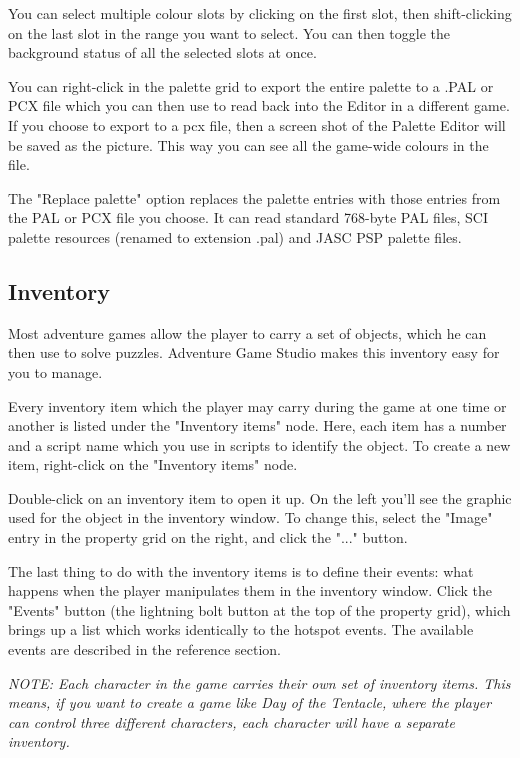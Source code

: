 You can select multiple colour slots by clicking on the first slot, then
shift-clicking on the last slot in the range you want to select. You can then
toggle the background status of all the selected slots at once.

You can right-click in the palette grid to export the entire palette to
a .PAL or PCX file which you can then use to read back into the Editor in
a different game.
If you choose to export to a pcx file, then a screen shot of the Palette Editor will
be saved as the picture. This way you can see all the game-wide colours in
the file.

The "Replace palette" option replaces the palette entries with those
entries from the PAL or PCX file you choose. It can read standard 768-byte
PAL files, SCI palette resources (renamed to extension .pal) and JASC PSP
palette files.

\subsection{Inventory}%

Most adventure games allow the player to carry a set of objects, which he can
then use to solve puzzles. Adventure Game Studio makes this inventory easy
for you to manage.

Every inventory item which the player may carry during the game at one time
or another is listed under the "Inventory items" node. Here, each item
has a number and a script name which you use in scripts to identify the object.
To create a new item, right-click on the "Inventory items" node.

Double-click on an inventory item to open it up. On the
left you'll see the graphic used for the object in the inventory window. To change
this, select the "Image" entry in the property grid on the right, and click the "..."
button.

The last thing to do with the inventory items is to define their events:
what happens when the player manipulates them in the inventory window. Click
the "Events" button (the lightning bolt button at the top of the property grid),
which brings up a list which works identically to the hotspot events.
The available events are described in the reference section.

\it{NOTE: Each character in the game carries their own set of inventory items.
This means, if you want to create a game like Day of the Tentacle, where the
player can control three different characters, each character will have a
separate inventory.}

